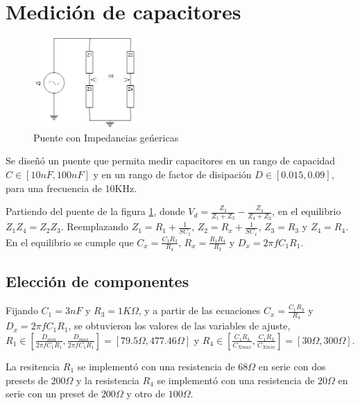 \documentclass[../../main.tex]{subfiles}
\begin{document}
\section{Medición de capacitores}

\begin{figure}[H]	
	\centering
	\includegraphics[width=0.35\textwidth]{fotos/PuenteGen.png}
	\caption{Puente con Impedancias ge\'nericas} \label{fig:pgc}
\end{figure}

Se diseñó un puente que permita medir capacitores en un rango de capacidad $C \in [10nF,100nF]$ y en un rango de factor de disipación $D \in[0.015 , 0.09 ] $, para una frecuencia de 10KHz. 
\par Partiendo del puente de la figura \ref{fig:pgc}, donde $V_d=\frac{Z_3}{Z_1+Z_3} -\frac{Z_4}{Z_4 + Z_2}$, en el equilibrio $Z_1 Z_4 = Z_2  Z_3$.  Reemplazando $Z_1= R_1 + \frac{1}{SC_1}$, $Z_2= R_x + \frac{1}{SC_x}$, $Z_3=R_3$ y $Z_4=R_4$. En el equilibrio se cumple que $C_x=\frac{C_1 R_3}{R_4}$, $R_x=\frac{R_1 R_4}{R_3}$ y $D_x=2 \pi f C_1 R_1$.

\subsection{Elección de componentes}
Fijando $C_1=3nF$ y $R_3=1K \Omega$, y a partir de las ecuaciones  $C_x=\frac{C_1 R_3}{R_4}$ y $D_x=2 \pi f C_1 R_1$, se obtuvieron los valores de las variables de ajuste, $R_1 \in \left[  \frac{D_{min}}{2 \pi f C_1 R_1} ,  \frac{D_{max}}{2 \pi f C_1 R_1}  \right] = \left[ 79.5\Omega , 477.46 \Omega   \right]$ y 
$R_4 \in \left[ \frac{C_1 R_3}{C_{Xmax}} , \frac{C_1 R_3}{C_{Xmin}} \right]=   \left[ 30\Omega , 300 \Omega   \right]$.
\par La resitencia $R_1$ se implementó con una resistencia de $68 \Omega$ en serie con dos presets de $200 \Omega$ y la resistencia $R_4$ se implementó con una resistencia de $20\Omega$ en serie con un preset de $200 \Omega$ y otro de $100 \Omega$.
\end{document}
